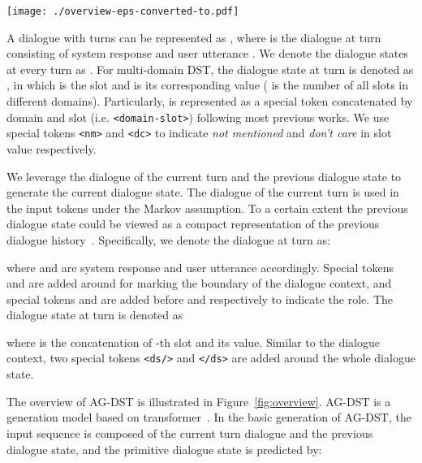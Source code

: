 \documentclass[11pt]{article}
\begin{document}
\begin{figure*}
	\centering
	\texttt{[image: ./overview-eps-converted-to.pdf]}
	\caption{The overview of the proposed AG-DST. In the basic generation, AG-DST takes the dialogue of the current turn  and the previous dialogue state  as input and generates the primitive dialogue state . In the amending generation, AG-DST takes the dialogue of the current turn  and the primitive dialogue state  as input and outputs the amended dialogue state .}
	\label{fig:overview}
\end{figure*}

A dialogue with  turns can be represented as , where  is the dialogue at turn  consisting of system response  and user utterance . We denote the dialogue states at every turn as . For multi-domain DST, the dialogue state at turn  is denoted as , in which  is the slot and  is its corresponding value ( is the number of all slots in different domains). Particularly,  is represented as a special token concatenated by domain and slot (i.e. \texttt{<domain-slot>}) following most previous works. We use special tokens \texttt{<nm>} and \texttt{<dc>} to indicate \textit{not mentioned} and \textit{don't care} in slot value respectively.


We leverage the dialogue of the current turn and the previous dialogue state to generate the current dialogue state. The dialogue of the current turn  is used in the input tokens under the Markov assumption. To a certain extent the previous dialogue state  could be viewed as a compact representation of the previous dialogue history~\citep{kim-etal-2020-efficient}. Specifically, we denote the dialogue at turn  as:

where  and  are system response and user utterance accordingly. Special tokens  and  are added around  for marking the boundary of the dialogue context, and special tokens  and  are added before  and  respectively to indicate the role. The dialogue state at turn  is denoted as

where  is the concatenation of -th slot and its value. Similar to the dialogue context, two special tokens \texttt{<ds/>} and \texttt{</ds>} are added around the whole dialogue state. 

The overview of AG-DST is illustrated in Figure~\ref{fig:overview}. AG-DST is a generation model based on transformer~\citep{vaswani2017attention,li2019unified}. In the basic generation of AG-DST, the input sequence is composed of the current turn dialogue and the previous dialogue state, and the primitive dialogue state is predicted by:
\end{document}
